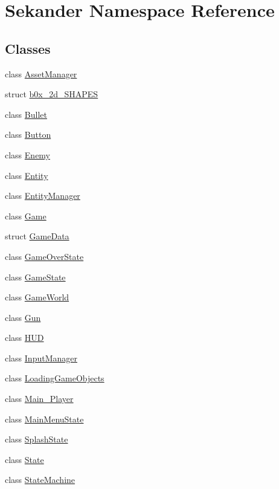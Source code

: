 \hypertarget{namespaceSekander}{}\section{Sekander Namespace Reference}
\label{namespaceSekander}
\subsection*{Classes}
\begin{DoxyCompactItemize}
\item 
class \hyperlink{classSekander_1_1AssetManager}{Asset\+Manager}
\item 
struct \hyperlink{structSekander_1_1b0x__2d__SHAPES}{b0x\+\_\+2d\+\_\+\+S\+H\+A\+P\+ES}
\item 
class \hyperlink{classSekander_1_1Bullet}{Bullet}
\item 
class \hyperlink{classSekander_1_1Button}{Button}
\item 
class \hyperlink{classSekander_1_1Enemy}{Enemy}
\item 
class \hyperlink{classSekander_1_1Entity}{Entity}
\item 
class \hyperlink{classSekander_1_1EntityManager}{Entity\+Manager}
\item 
class \hyperlink{classSekander_1_1Game}{Game}
\item 
struct \hyperlink{structSekander_1_1GameData}{Game\+Data}
\item 
class \hyperlink{classSekander_1_1GameOverState}{Game\+Over\+State}
\item 
class \hyperlink{classSekander_1_1GameState}{Game\+State}
\item 
class \hyperlink{classSekander_1_1GameWorld}{Game\+World}
\item 
class \hyperlink{classSekander_1_1Gun}{Gun}
\item 
class \hyperlink{classSekander_1_1HUD}{H\+UD}
\item 
class \hyperlink{classSekander_1_1InputManager}{Input\+Manager}
\item 
class \hyperlink{classSekander_1_1LoadingGameObjects}{Loading\+Game\+Objects}
\item 
class \hyperlink{classSekander_1_1Main__Player}{Main\+\_\+\+Player}
\item 
class \hyperlink{classSekander_1_1MainMenuState}{Main\+Menu\+State}
\item 
class \hyperlink{classSekander_1_1SplashState}{Splash\+State}
\item 
class \hyperlink{classSekander_1_1State}{State}
\item 
class \hyperlink{classSekander_1_1StateMachine}{State\+Machine}
\end{DoxyCompactItemize}
